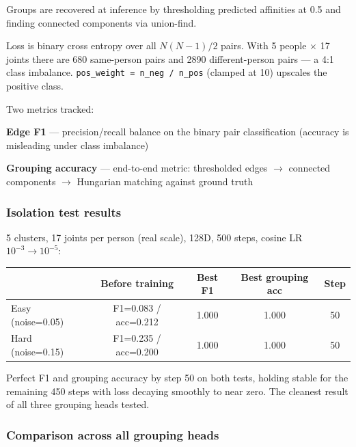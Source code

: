Groups are recovered at inference by thresholding predicted affinities at 0.5 and finding connected components via union-find.

Loss is binary cross entropy over all $N(N-1)/2$ pairs. With 5 people $\times$ 17 joints there are 680 same-person pairs and 2890 different-person pairs --- a 4:1 class imbalance. \texttt{pos\_weight = n\_neg / n\_pos} (clamped at 10) upscales the positive class.

Two metrics tracked:
\begin{compactitem}
  \item \textbf{Edge F1} --- precision/recall balance on the binary pair classification (accuracy is misleading under class imbalance)
  \item \textbf{Grouping accuracy} --- end-to-end metric: thresholded edges $\to$ connected components $\to$ Hungarian matching against ground truth
\end{compactitem}


\subsubsection{Isolation test results}

5 clusters, 17 joints per person (real scale), 128D, 500 steps, cosine LR $10^{-3} \to 10^{-5}$:

\begin{center}
\begin{tabular}{lcccc}
\toprule
 & Before training & Best F1 & Best grouping acc & Step \\
\midrule
Easy (noise=0.05) & F1=0.083 / acc=0.212 & 1.000 & 1.000 & 50 \\
Hard (noise=0.15) & F1=0.235 / acc=0.200 & 1.000 & 1.000 & 50 \\
\bottomrule
\end{tabular}
\end{center}

Perfect F1 and grouping accuracy by step 50 on both tests, holding stable for the remaining 450 steps with loss decaying smoothly to near zero. The cleanest result of all three grouping heads tested.


\subsubsection{Comparison across all grouping heads}


